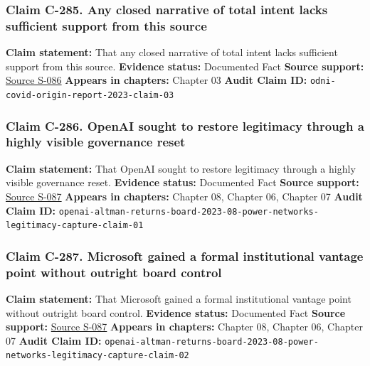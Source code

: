 \documentclass[
  american,
  11pt,
  letterpaper,
]{article}
\begin{document}
\subsubsection{Claim C-285. Any closed narrative of total intent lacks
sufficient support from this
source}\label{claim-c-285-any-closed-narrative-of-total-intent-lacks-sufficient-support-from-this-source}

\textbf{Claim statement:} That any closed narrative of total intent
lacks sufficient support from this source. \textbf{Evidence status:}
Documented Fact \textbf{Source support:}
\hyperref[source-s-086-report-on-potential-links-between-the-wuhan-institute-of-virology-and-the-origins-of-covid-19]{Source
S-086} \textbf{Appears in chapters:} Chapter 03 \textbf{Audit Claim ID:}
\texttt{odni-covid-origin-report-2023-claim-03}

\subsubsection{Claim C-286. OpenAI sought to restore legitimacy through
a highly visible governance
reset}\label{claim-c-286-openai-sought-to-restore-legitimacy-through-a-highly-visible-governance-reset}

\textbf{Claim statement:} That OpenAI sought to restore legitimacy
through a highly visible governance reset. \textbf{Evidence status:}
Documented Fact \textbf{Source support:}
\hyperref[source-s-087-sam-altman-returns-as-ceo-openai-has-a-new-initial-board]{Source
S-087} \textbf{Appears in chapters:} Chapter 08, Chapter 06, Chapter 07
\textbf{Audit Claim ID:}
\texttt{openai-altman-returns-board-2023-08-power-networks-legitimacy-capture-claim-01}

\subsubsection{Claim C-287. Microsoft gained a formal institutional
vantage point without outright board
control}\label{claim-c-287-microsoft-gained-a-formal-institutional-vantage-point-without-outright-board-control}

\textbf{Claim statement:} That Microsoft gained a formal institutional
vantage point without outright board control. \textbf{Evidence status:}
Documented Fact \textbf{Source support:}
\hyperref[source-s-087-sam-altman-returns-as-ceo-openai-has-a-new-initial-board]{Source
S-087} \textbf{Appears in chapters:} Chapter 08, Chapter 06, Chapter 07
\textbf{Audit Claim ID:}
\texttt{openai-altman-returns-board-2023-08-power-networks-legitimacy-capture-claim-02}
\end{document}
